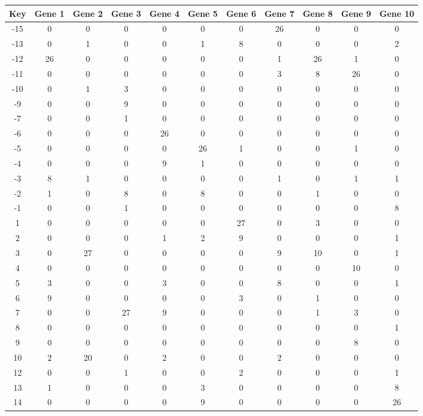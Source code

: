 \begin{tabular}{|c|c|c|c|c|c|c|c|c|c|c|}
\hline
Key & Gene 1 & Gene 2 & Gene 3 & Gene 4 & Gene 5 & Gene 6 & Gene 7 & Gene 8 & Gene 9 & Gene 10 \\
\hline
-15 & 0 & 0 & 0 & 0 & 0 & 0 & 26 & 0 & 0 & 0 \\
-13 & 0 & 1 & 0 & 0 & 1 & 8 & 0 & 0 & 0 & 2 \\
-12 & 26 & 0 & 0 & 0 & 0 & 0 & 1 & 26 & 1 & 0 \\
-11 & 0 & 0 & 0 & 0 & 0 & 0 & 3 & 8 & 26 & 0 \\
-10 & 0 & 1 & 3 & 0 & 0 & 0 & 0 & 0 & 0 & 0 \\
-9 & 0 & 0 & 9 & 0 & 0 & 0 & 0 & 0 & 0 & 0 \\
-7 & 0 & 0 & 1 & 0 & 0 & 0 & 0 & 0 & 0 & 0 \\
-6 & 0 & 0 & 0 & 26 & 0 & 0 & 0 & 0 & 0 & 0 \\
-5 & 0 & 0 & 0 & 0 & 26 & 1 & 0 & 0 & 1 & 0 \\
-4 & 0 & 0 & 0 & 9 & 1 & 0 & 0 & 0 & 0 & 0 \\
-3 & 8 & 1 & 0 & 0 & 0 & 0 & 1 & 0 & 1 & 1 \\
-2 & 1 & 0 & 8 & 0 & 8 & 0 & 0 & 1 & 0 & 0 \\
-1 & 0 & 0 & 1 & 0 & 0 & 0 & 0 & 0 & 0 & 8 \\
1 & 0 & 0 & 0 & 0 & 0 & 27 & 0 & 3 & 0 & 0 \\
2 & 0 & 0 & 0 & 1 & 2 & 9 & 0 & 0 & 0 & 1 \\
3 & 0 & 27 & 0 & 0 & 0 & 0 & 9 & 10 & 0 & 1 \\
4 & 0 & 0 & 0 & 0 & 0 & 0 & 0 & 0 & 10 & 0 \\
5 & 3 & 0 & 0 & 3 & 0 & 0 & 8 & 0 & 0 & 1 \\
6 & 9 & 0 & 0 & 0 & 0 & 3 & 0 & 1 & 0 & 0 \\
7 & 0 & 0 & 27 & 9 & 0 & 0 & 0 & 1 & 3 & 0 \\
8 & 0 & 0 & 0 & 0 & 0 & 0 & 0 & 0 & 0 & 1 \\
9 & 0 & 0 & 0 & 0 & 0 & 0 & 0 & 0 & 8 & 0 \\
10 & 2 & 20 & 0 & 2 & 0 & 0 & 2 & 0 & 0 & 0 \\
12 & 0 & 0 & 1 & 0 & 0 & 2 & 0 & 0 & 0 & 1 \\
13 & 1 & 0 & 0 & 0 & 3 & 0 & 0 & 0 & 0 & 8 \\
14 & 0 & 0 & 0 & 0 & 9 & 0 & 0 & 0 & 0 & 26 \\
\hline
\end{tabular}